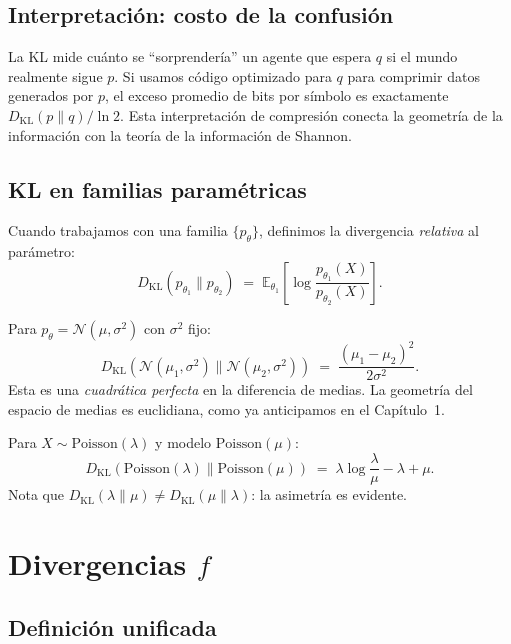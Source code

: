 \subsection{Interpretación: costo de la confusión}

La KL mide cuánto se ``sorprendería'' un agente que espera $q$ si el mundo realmente sigue $p$.  Si usamos código optimizado para $q$ para comprimir datos generados por $p$, el exceso promedio de bits por símbolo es exactamente $D_{\mathrm{KL}}(p \| q) / \ln 2$.  Esta interpretación de compresión conecta la geometría de la información con la teoría de la información de Shannon.

\subsection{KL en familias paramétricas}

Cuando trabajamos con una familia $\{p_\theta\}$, definimos la divergencia \emph{relativa} al parámetro:
\[
D_{\mathrm{KL}}(p_{\theta_1} \| p_{\theta_2}) \;=\; \mathbb{E}_{\theta_1}\!\left[\log \frac{p_{\theta_1}(X)}{p_{\theta_2}(X)}\right].
\]

\begin{example}
	Para $p_{\theta} = \mathcal{N}(\mu, \sigma^2)$ con $\sigma^2$ fijo:
	\[
	D_{\mathrm{KL}}(\mathcal{N}(\mu_1, \sigma^2) \| \mathcal{N}(\mu_2, \sigma^2)) \;=\; \frac{(\mu_1 - \mu_2)^2}{2\sigma^2}.
	\]
	Esta es una \emph{cuadrática perfecta} en la diferencia de medias.  La geometría del espacio de medias es euclidiana, como ya anticipamos en el Capítulo~1.
\end{example}

\begin{example}
	Para $X \sim \mathrm{Poisson}(\lambda)$ y modelo $\mathrm{Poisson}(\mu)$:
	\[
	D_{\mathrm{KL}}(\mathrm{Poisson}(\lambda) \| \mathrm{Poisson}(\mu)) \;=\; \lambda \log \frac{\lambda}{\mu} - \lambda + \mu.
	\]
	Nota que $D_{\mathrm{KL}}(\lambda \| \mu) \ne D_{\mathrm{KL}}(\mu \| \lambda)$: la asimetría es evidente.
\end{example}

\section{Divergencias $f$}

\subsection{Definición unificada}

